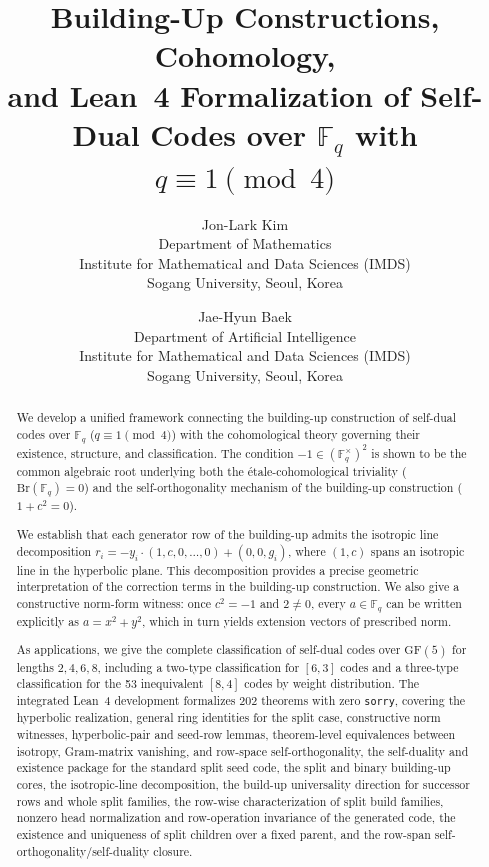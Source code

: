 \documentclass[12pt]{article}
\newcommand{\F}{\mathbb{F}}
\newcommand{\GF}[1]{\ensuremath{\mathrm{GF}(#1)}}
\newcommand{\Br}{\mathrm{Br}}
\begin{document}
\title{Building-Up Constructions, Cohomology,\\ and Lean~4 Formalization
of Self-Dual Codes over $\F_q$ with $q \equiv 1 \pmod{4}$}

\author{
Jon-Lark Kim\\
Department of Mathematics \\
Institute for Mathematical and Data Sciences (IMDS) \\
Sogang University, Seoul, Korea
\and
Jae-Hyun Baek \\
Department of Artificial Intelligence \\
Institute for Mathematical and Data Sciences (IMDS) \\
Sogang University, Seoul, Korea
}

\maketitle

\begin{abstract}
We develop a unified framework connecting the building-up construction of self-dual codes over $\F_q$ ($q \equiv 1 \pmod{4}$) with the cohomological theory governing their existence, structure, and classification.
The condition $-1 \in (\F_q^\times)^2$ is shown to be the common algebraic root underlying both the \'etale-cohomological triviality ($\Br(\F_q) = 0$) and the self-orthogonality mechanism of the building-up construction ($1 + c^2 = 0$).

We establish that each generator row of the building-up admits the isotropic line decomposition $r_i = -y_i \cdot (1, c, 0, \ldots, 0) + (0, 0, g_i)$, where $(1, c)$ spans an isotropic line in the hyperbolic plane. This decomposition provides a precise geometric interpretation of the correction terms in the building-up construction. We also give a constructive norm-form witness: once $c^2=-1$ and $2\neq 0$, every $a\in\F_q$ can be written explicitly as $a=x^2+y^2$, which in turn yields extension vectors of prescribed norm.

As applications, we give the complete classification of self-dual codes over $\GF{5}$ for lengths $2, 4, 6, 8$, including a two-type classification for $[6,3]$ codes and a three-type classification for the 53 inequivalent $[8,4]$ codes by weight distribution. The integrated Lean~4 development formalizes 202 theorems with zero \texttt{sorry}, covering the hyperbolic realization, general ring identities for the split case, constructive norm witnesses, hyperbolic-pair and seed-row lemmas, theorem-level equivalences between isotropy, Gram-matrix vanishing, and row-space self-orthogonality, the self-duality and existence package for the standard split seed code, the split and binary building-up cores, the isotropic-line decomposition, the build-up universality direction for successor rows and whole split families, the row-wise characterization of split build families, nonzero head normalization and row-operation invariance of the generated code, the existence and uniqueness of split children over a fixed parent, and the row-span self-orthogonality/self-duality closure.
\end{abstract}
\end{document}
